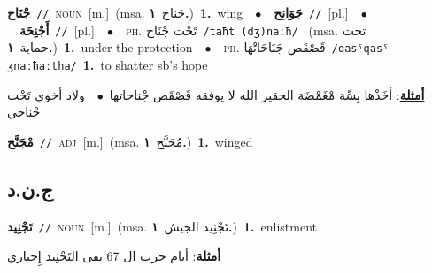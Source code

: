 \documentclass[10pt,a4paper,twoside]{article} %
\begin{document}
\begin{multicols}{2}
{\setlength\topsep{0pt}\textbf{\foreignlanguage{arabic}{جْنَاح}}\ {\color{gray}\texttt{//}\color{black}}\ \textsc{noun}\ [m.]\ \color{gray}(msa. \foreignlanguage{arabic}{جَناح}~\foreignlanguage{arabic}{\textbf{١.}})\color{black}\ \textbf{1.}~wing\ \ $\bullet$\ \ \setlength\topsep{0pt}\textbf{\foreignlanguage{arabic}{جَوَانِح}}\ {\color{gray}\texttt{//}\color{black}}\ [pl.]\ \ $\bullet$\ \ \setlength\topsep{0pt}\textbf{\foreignlanguage{arabic}{أَجْنِحَة}}\ {\color{gray}\texttt{//}\color{black}}\ [pl.]\ \ $\bullet$\ \ \textsc{ph.} \color{gray} \foreignlanguage{arabic}{تَحْت جْنَاح}\color{black}\ {\color{gray}\texttt{/{\sffamily taħt (dʒ)naːħ}/}\color{black}}\ \color{gray} (msa. \foreignlanguage{arabic}{تحت حماية}~\foreignlanguage{arabic}{\textbf{١.}})\color{black}\ \textbf{1.}~under the protection\ \ $\bullet$\ \ \textsc{ph.} \color{gray} \foreignlanguage{arabic}{قَصْقَص جَنَاحَاتْهَا}\color{black}\ {\color{gray}\texttt{/{\sffamily qasˤqasˤ ʒnaːħaːtha}/}\color{black}}\ \textbf{1.}~to shatter sb's hope\  \begin{flushright}\color{gray}\foreignlanguage{arabic}{\textbf{\underline{\foreignlanguage{arabic}{أمثلة}}}: أخَذْها بِسِّة مْغَمْضَة الحقير الله لا يوفقه قَصْقَص جْناحاتها\ $\bullet$\ \  ولاد أخوي تَحْت جْناحي}\end{flushright}\color{black}} \vspace{2mm}

{\setlength\topsep{0pt}\textbf{\foreignlanguage{arabic}{مْجَنَّح}}\ {\color{gray}\texttt{//}\color{black}}\ \textsc{adj}\ [m.]\ \color{gray}(msa. \foreignlanguage{arabic}{مُجَنَّح}~\foreignlanguage{arabic}{\textbf{١.}})\color{black}\ \textbf{1.}~winged\ } \vspace{2mm}

\vspace{-3mm}
\subsection*{\color{blue}\foreignlanguage{arabic}{ج.ن.د}\color{blue}{}} 

{\setlength\topsep{0pt}\textbf{\foreignlanguage{arabic}{تَجْنِيد}}\ {\color{gray}\texttt{//}\color{black}}\ \textsc{noun}\ [m.]\ \color{gray}(msa. \foreignlanguage{arabic}{تَجْنِيد الجيش}~\foreignlanguage{arabic}{\textbf{١.}})\color{black}\ \textbf{1.}~enlistment\  \begin{flushright}\color{gray}\foreignlanguage{arabic}{\textbf{\underline{\foreignlanguage{arabic}{أمثلة}}}: أيام حرب ال 67 بقى التَجْنِيد إِجباري}\end{flushright}\color{black}} \vspace{2mm}


\end{multicols}
\end{document}
